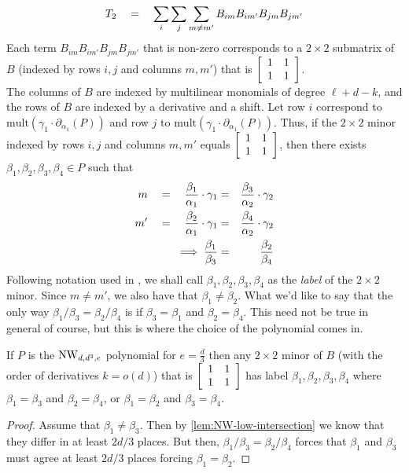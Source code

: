 \[
T_2 \quad = \quad \sum_i \sum_j \sum_{m\neq m'} B_{im}B_{im'}B_{jm}B_{jm'}
\]
Each term $B_{im}B_{im'}B_{jm}B_{jm'}$ that is non-zero corresponds to a $2\times 2$ submatrix of $B$ (indexed by rows $i,j$ and columns $m,m'$) that is $\left[\begin{array}{cc} 1 & 1\\ 1&1
  \end{array}\right]$. \\

The columns of $B$ are indexed by multilinear monomials of degree $\ell + d - k$, and the rows of $B$ are indexed by a derivative and a shift. 
Let row $i$ correspond to $\mathrm{mult}(\gamma_1 \cdot \partial_{\alpha_1}(P))$ and row $j$ to $\mathrm{mult}(\gamma_1 \cdot \partial_{\alpha_1}(P))$. 
Thus, if the $2\times 2$ minor indexed by rows $i,j$ and columns $m,m'$ equals $\left[\begin{array}{cc} 1 & 1\\ 1&1 \end{array}\right]$, then there exists $\beta_1, \beta_2,\beta_3,\beta_4 \in P$ such that
\begin{eqnarray*}
m \quad = \quad \frac{\beta_1}{\alpha_1}\cdot \gamma_1 & = & \frac{\beta_3}{\alpha_2} \cdot  \gamma_2\\
m' \quad = \quad \frac{\beta_2}{\alpha_1}\cdot \gamma_1 & = & \frac{\beta_4}{\alpha_2}\cdot \gamma_2\\
\implies \frac{\beta_1}{\beta_3} & = & \frac{\beta_2}{\beta_4}
\end{eqnarray*}
Following notation used in \cite{KLSS}, we shall call $\beta_1,\beta_2,\beta_3,\beta_4$ as the \emph{label} of the $2\times 2$ minor. 
Since $m\neq m'$, we also have that $\beta_1 \neq \beta_2$. 
What we'd like to say that the only way $\beta_1/\beta_3 = \beta_2/\beta_4$ is if $\beta_3 = \beta_1$ and $\beta_2 = \beta_4$. 
This need not be true in general of course, but this is where the choice of the polynomial comes in. 

\begin{claim}
If $P$ is the $\operatorname{\mathrm{NW}}_{d,d^3, e}$ polynomial for $e = \frac{d}{3}$ then any $2\times 2$ minor of $B$ (with the order of derivatives $k = o(d)$) that is $\left[\begin{array}{cc} 1&1\\1&1\end{array}\right]$ has label $\beta_1,\beta_2,\beta_3,\beta_4$ where $\beta_1 = \beta_3$ and $\beta_2 = \beta_4$, or $\beta_1 = \beta_2$ and $\beta_3 = \beta_4$. 
\end{claim}
\begin{proof}
Assume that $\beta_1 \neq \beta_3$. 
Then by \autoref{lem:NW-low-intersection} we know that they differ in at least $2d/3$ places. 
But then, $\beta_1/\beta_3 = \beta_2/\beta_4$ forces that $\beta_1$ and $\beta_3$ must agree at least $2d/3$ places forcing $\beta_1 = \beta_2$. 
\end{proof}

